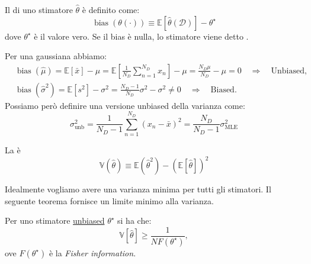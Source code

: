 \documentclass[10pt]{article}
\DeclareMathOperator{\bias}{bias}
\newcommand{\MLE}{\ensuremath{\text{MLE}}}
\begin{document}
    \begin{definition}[Bias]
        Il  di uno stimatore \( \hat{\theta} \) è definito come:
        \begin{equation}
            \bias \left( \theta(\cdot) \right) \equiv \mathbb{E} \left[ \hat{\theta} \left( \mathcal{D} \right) \right] - \theta^\star
        \end{equation}
        dove \( \theta^\star \) è il valore vero. Se il bias è nulla, lo stimatore viene detto
        .
    \end{definition}

    Per una gaussiana abbiamo:
    \begin{align}
        & \bias \left( \hat{\mu} \right) = \mathbb{E} \left[\bar{x}\right] - \mu = \mathbb{E} \left[ \frac{1}{N_D}\sum_{n=1}^{N_D} x_n \right] - \mu = \frac{N_D \mu}{N_D} - \mu = 0  \quad \Longrightarrow \quad \text{Unbiased},  \\
        & \bias \left( \hat{\sigma}^2 \right) = \mathbb{E} \left[ s^2 \right] - \sigma^2 = \frac{N_D - 1}{N_D}\sigma^2 - \sigma^2 \neq 0  \quad \Longrightarrow \quad \text{Biased}.
    \end{align}
    Possiamo però definire una versione unbiased della varianza come:
    \begin{equation}
        \sigma^2_{\text{unb}} = \frac{1}{N_D - 1}\sum_{n=1}^{N_D} {\left( x_n - \bar{x} \right)}^2 = \frac{N_D}{N_D - 1}\sigma^2_{\MLE}
    \end{equation}

    \begin{definition}
        La  è
        \begin{equation}
            \mathbb{V} ( \hat{\theta} ) \equiv \mathbb{E} ( \hat{\theta}^2 ) - {( \mathbb{E} [ \hat{\theta} ] )}^2
        \end{equation}
    \end{definition}

    Idealmente vogliamo avere una varianza minima per tutti gli stimatori. Il seguente
    teorema fornisce un limite minimo alla varianza.

    \begin{theorem}
        Per uno stimatore \underline{unbiased} \( \theta^\star \) si ha che:
        \begin{equation}
            \mathbb{V} \left[ \hat{\theta} \right] \geq \frac{1}{NF(\theta^\star)},
        \end{equation}
        ove \( F(\theta^\star) \) è la \textit{Fisher information}.
    \end{theorem}
\end{document}
